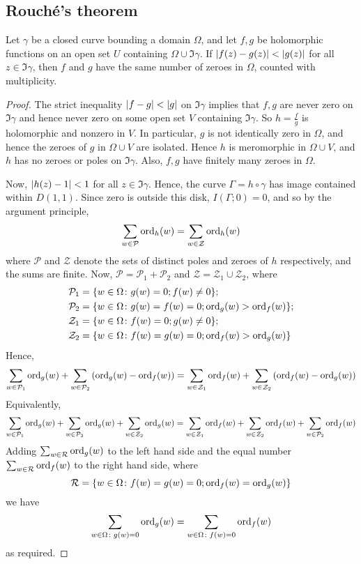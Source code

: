 \subsection{Rouch\'e's theorem}
\begin{theorem}
	Let \( \gamma \) be a closed curve bounding a domain \( \Omega \), and let \( f,g \) be holomorphic functions on an open set \( U \) containing \( \Omega \cup \Im \gamma \).
	If \( \abs{f(z) - g(z)} < \abs{g(z)} \) for all \( z \in \Im \gamma \), then \( f \) and \( g \) have the same number of zeroes in \( \Omega \), counted with multiplicity.
\end{theorem}
\begin{proof}
	The strict inequality \( \abs{f-g} < \abs{g} \) on \( \Im \gamma \) implies that \( f,g \) are never zero on \( \Im \gamma \) and hence never zero on some open set \( V \) containing \( \Im \gamma \).
	So \( h = \frac{f}{g} \) is holomorphic and nonzero in \( V \).
	In particular, \( g \) is not identically zero in \( \Omega \), and hence the zeroes of \( g \) in \( \Omega \cup V \) are isolated.
	Hence \( h \) is meromorphic in \( \Omega \cup V \), and \( h \) has no zeroes or poles on \( \Im \gamma \).
	Also, \( f, g \) have finitely many zeroes in \( \Omega \).

	Now, \( \abs{h(z) - 1} < 1 \) for all \( z \in \Im \gamma \).
	Hence, the curve \( \Gamma = h \circ \gamma \) has image contained within \( D(1,1) \).
	Since zero is outside this disk, \( I(\Gamma;0) = 0 \), and so by the argument principle,
	\[ \sum_{w \in \mathcal P} \operatorname{ord}_h(w) = \sum_{w \in \mathcal Z} \operatorname{ord}_h(w) \]
	where \( \mathcal P \) and \( \mathcal Z \) denote the sets of distinct poles and zeroes of \( h \) respectively, and the sums are finite.
	Now, \( \mathcal P = \mathcal P_1 + \mathcal P_2 \) and \( \mathcal Z = \mathcal Z_1 \cup \mathcal Z_2 \), where
	\begin{align*}
		\mathcal P_1 &= \qty{w \in \Omega \colon g(w) = 0; f(w) \neq 0}; \\
		\mathcal P_2 &= \qty{w \in \Omega \colon g(w) = f(w) = 0; \operatorname{ord}_g(w) > \operatorname{ord}_f(w)}; \\
		\mathcal Z_1 &= \qty{w \in \Omega \colon f(w) = 0; g(w) \neq 0}; \\
		\mathcal Z_2 &= \qty{w \in \Omega \colon f(w) = g(w) = 0; \operatorname{ord}_f(w) > \operatorname{ord}_g(w)}
	\end{align*}
	Hence,
	\[ \sum_{w \in \mathcal P_1} \operatorname{ord}_g(w) + \sum_{w \in \mathcal P_2} \qty(\operatorname{ord}_g(w) - \operatorname{ord}_f(w)) = \sum_{w \in \mathcal Z_1} \operatorname{ord}_f(w) + \sum_{w \in \mathcal Z_2} \qty(\operatorname{ord}_f(w) - \operatorname{ord}_g(w)) \]
	Equivalently,
	\[ \sum_{w \in \mathcal P_1} \operatorname{ord}_g(w) + \sum_{w \in \mathcal P_2} \operatorname{ord}_g(w) + \sum_{w \in \mathcal Z_2} \operatorname{ord}_g(w) =
	\sum_{w \in \mathcal Z_1} \operatorname{ord}_f(w) + \sum_{w \in \mathcal Z_2} \operatorname{ord}_f(w) + \sum_{w \in \mathcal P_2} \operatorname{ord}_f(w) \]
	Adding \( \sum_{w \in \mathcal R} \operatorname{ord}_g(w) \) to the left hand side and the equal number \( \sum_{w \in \mathcal R} \operatorname{ord}_f(w) \) to the right hand side, where
	\[ \mathcal R = \qty{w \in \Omega \colon f(w) = g(w) = 0; \operatorname{ord}_f(w) = \operatorname{ord}_g(w)} \]
	we have
	\[ \sum_{w \in \Omega \colon g(w) = 0} \operatorname{ord}_g(w) = \sum_{w \in \Omega \colon f(w) = 0} \operatorname{ord}_f(w) \]
	as required.
\end{proof}
